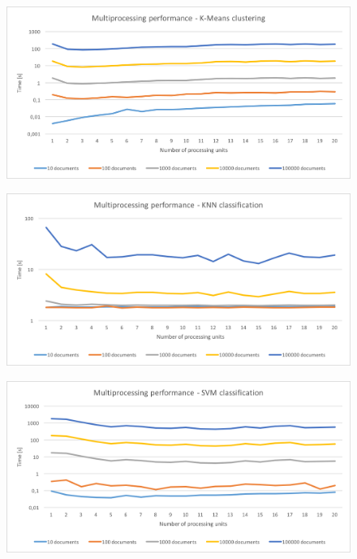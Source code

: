   \begin{figure}[ht]
\begin{center}
 \includegraphics[width=0.9\linewidth]{images/tests/mp-kmeans.png}
 \caption{ }
 \label{mp-kmeans}
 \end{center}
 \end{figure}
 
  \begin{figure}[ht]
\begin{center}
 \includegraphics[width=0.9\linewidth]{images/tests/mp-knn.png}
 \caption{ }
 \label{mp-knn}
 \end{center}
 \end{figure}
 
  \begin{figure}[ht]
\begin{center}
 \includegraphics[width=0.9\linewidth]{images/tests/mp-svm.png}
 \caption{ }
 \label{mp-svm}
 \end{center}
 \end{figure}